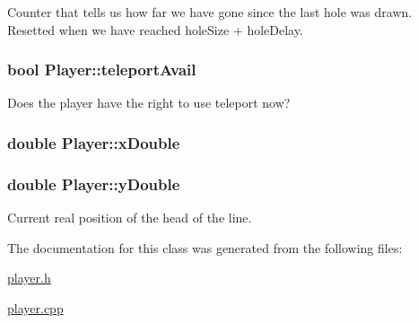 Counter that tells us how far we have gone since the last hole was drawn. Resetted when we have reached hole\+Size + hole\+Delay. 

\hypertarget{classPlayer_ac3a0aaedb90e87c36bbfb19d5092cb7b}{}
\subsubsection[{teleport\+Avail}]{\setlength{\rightskip}{0pt plus 5cm}bool Player\+::teleport\+Avail\hspace{0.3cm}{\ttfamily [private]}}\label{classPlayer_ac3a0aaedb90e87c36bbfb19d5092cb7b}


Does the player have the right to use teleport now? 

\hypertarget{classPlayer_a7fe7124fd9eeb4bca23da301b913cdd3}{}
\subsubsection[{x\+Double}]{\setlength{\rightskip}{0pt plus 5cm}double Player\+::x\+Double\hspace{0.3cm}{\ttfamily [private]}}\label{classPlayer_a7fe7124fd9eeb4bca23da301b913cdd3}
\hypertarget{classPlayer_a10fdd50d5dd7c1bb4799f8f40e505a76}{}
\subsubsection[{y\+Double}]{\setlength{\rightskip}{0pt plus 5cm}double Player\+::y\+Double\hspace{0.3cm}{\ttfamily [private]}}\label{classPlayer_a10fdd50d5dd7c1bb4799f8f40e505a76}


Current real position of the head of the line. 



The documentation for this class was generated from the following files\+:\begin{DoxyCompactItemize}
\item 
\hyperlink{player_8h}{player.\+h}\item 
\hyperlink{player_8cpp}{player.\+cpp}\end{DoxyCompactItemize}
